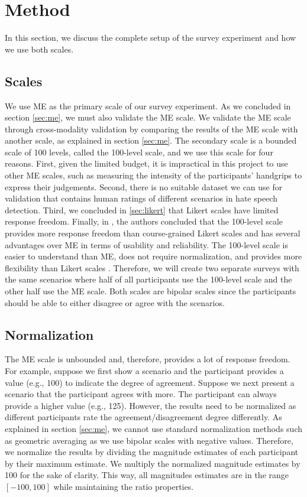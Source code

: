 \section{Method}
\label{sec:survey-method}
In this section, we discuss the complete setup of the survey experiment and how we use both scales.

\subsection{Scales}
We use ME as the primary scale of our survey experiment.
%
As we concluded in section \ref{sec:me}, we must also validate the ME scale.
%
We validate the ME scale through cross-modality validation by comparing the results of the ME scale with another scale, as explained in section \ref{sec:me}.
%
The secondary scale is a bounded scale of 100 levels, called the 100-level scale, and we use this scale for four reasons.
%
First, given the limited budget, it is impractical in this project to use other ME scales, such as measuring the intensity of the participants' handgrips to express their judgements.
%
Second, there is no suitable dataset we can use for validation that contains human ratings of different scenarios in hate speech detection.
%
Third, we concluded in \ref{sec:likert} that Likert scales have limited response freedom.
%
Finally, in \citet{roitero2018fine}, the authors concluded that the 100-level scale provides more response freedom than course-grained Likert scales and has several advantages over ME in terms of usability and reliability.
%
The 100-level scale is easier to understand than ME, does not require normalization, and provides more flexibility than Likert scales \citep{roitero2018fine}.
%
Therefore, we will create two separate surveys with the same scenarios where half of all participants use the 100-level scale and the other half use the ME scale.
%
Both scales are bipolar scales since the participants should be able to either disagree or agree with the scenarios.

\subsection{Normalization}
The ME scale is unbounded and, therefore, provides a lot of response freedom.
%
For example, suppose we first show a scenario and the participant provides a value (e.g., 100) to indicate the degree of agreement.
%
Suppose we next present a scenario that the participant agrees with more.
%
The participant can always provide a higher value (e.g., 125).
%
However, the results need to be normalized as different participants rate the agreement/disagreement degree differently.
%
As explained in section \ref{sec:me}, we cannot use standard normalization methods such as geometric averaging as we use bipolar scales with negative values.
%
Therefore, we normalize the results by dividing the magnitude estimates of each participant by their maximum estimate.
%
We multiply the normalized magnitude estimates by 100 for the sake of clarity.
%
This way, all magnitudes estimates are in the range $[-100, 100]$ while maintaining the ratio properties.

